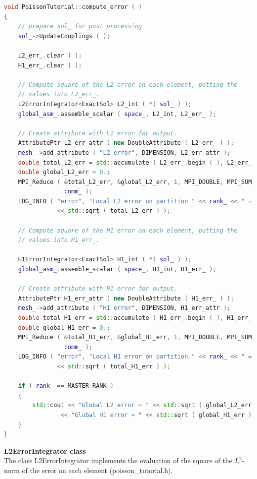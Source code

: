 \documentclass[a4paper, 11pt, twoside]{article}
\begin{document}
\begin{lstlisting}[language=C++, basicstyle={\footnotesize, \ttfamily}, keywordstyle=\color{blue}, numbers=none, tabsize=4]
void PoissonTutorial::compute_error ( )
{
    // prepare sol_ for post processing
    sol_->UpdateCouplings ( );

    L2_err_.clear ( );
    H1_err_.clear ( );

    // Compute square of the L2 error on each element, putting the
    // values into L2_err_.
    L2ErrorIntegrator<ExactSol> L2_int ( *( sol_ ) );
    global_asm_.assemble_scalar ( space_, L2_int, L2_err_ );

    // Create attribute with L2 error for output.
    AttributePtr L2_err_attr ( new DoubleAttribute ( L2_err_ ) );
    mesh_->add_attribute ( "L2 error", DIMENSION, L2_err_attr );
    double total_L2_err = std::accumulate ( L2_err_.begin ( ), L2_err_.end ( ), 0. );
    double global_L2_err = 0.;
    MPI_Reduce ( &total_L2_err, &global_L2_err, 1, MPI_DOUBLE, MPI_SUM, MASTER_RANK,
                 comm_ );
    LOG_INFO ( "error", "Local L2 error on partition " << rank_ << " = "
               << std::sqrt ( total_L2_err ) );

    // Compute square of the H1 error on each element, putting the
    // values into H1_err_.

    H1ErrorIntegrator<ExactSol> H1_int ( *( sol_ ) );
    global_asm_.assemble_scalar ( space_, H1_int, H1_err_ );

    // Create attribute with H1 error for output.
    AttributePtr H1_err_attr ( new DoubleAttribute ( H1_err_ ) );
    mesh_->add_attribute ( "H1 error", DIMENSION, H1_err_attr );
    double total_H1_err = std::accumulate ( H1_err_.begin ( ), H1_err_.end ( ), 0. );
    double global_H1_err = 0.;
    MPI_Reduce ( &total_H1_err, &global_H1_err, 1, MPI_DOUBLE, MPI_SUM, MASTER_RANK,
                 comm_ );
    LOG_INFO ( "error", "Local H1 error on partition " << rank_ << " = "
               << std::sqrt ( total_H1_err ) );

    if ( rank_ == MASTER_RANK )
    {
        std::cout << "Global L2 error = " << std::sqrt ( global_L2_err ) << "\n"
                << "Global H1 error = " << std::sqrt ( global_H1_err ) << "\n";
    }
}
\end{lstlisting}

\textbf{L2ErrorIntegrator class}\\
The class L2ErrorIntegrator implements the evaluation of the square of the $L^2$-norm of the error on each element (poisson\_tutorial.h).
\end{document}
